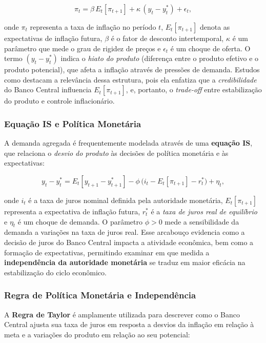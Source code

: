 \documentclass[a4paper,12pt]{article}[abnt2]
\begin{document}
\begin{equation}
\pi_t = \beta \, E_t[\pi_{t+1}] + \kappa \, (y_t - y_t^*) + \epsilon_t,
\end{equation}

onde $\pi_t$ representa a taxa de inflação no período $t$, $E_t[\pi_{t+1}]$ denota as expectativas de inflação futura, $\beta$ é o fator de desconto intertemporal, $\kappa$ é um parâmetro que mede o grau de rigidez de preços e $\epsilon_t$ é um choque de oferta. O termo $(y_t - y_t^*)$ indica o \emph{hiato do produto} (diferença entre o produto efetivo e o produto potencial), que afeta a inflação através de pressões de demanda. Estudos como \cite{unsal2023} destacam a relevância dessa estrutura, pois ela enfatiza que a \emph{credibilidade} do Banco Central influencia $E_t[\pi_{t+1}]$, e, portanto, o \emph{trade-off} entre estabilização do produto e controle inflacionário.

\subsubsection{\textbf{Equação IS e Política Monetária}}
A demanda agregada é frequentemente modelada através de uma \textbf{equação IS}, que relaciona o \emph{desvio do produto} às decisões de política monetária e às expectativas:

\begin{equation}
y_t - y_t^* = E_t[y_{t+1} - y_{t+1}^*] - \phi \, \big( i_t - E_t[\pi_{t+1}] - r_t^* \big) + \eta_t,
\end{equation}

onde $i_t$ é a taxa de juros nominal definida pela autoridade monetária, $E_t[\pi_{t+1}]$ representa a expectativa de inflação futura, $r_t^*$ é a \emph{taxa de juros real de equilíbrio} e $\eta_t$ é um choque de demanda. O parâmetro $\phi > 0$ mede a sensibilidade da demanda a variações na taxa de juros real. Esse arcabouço evidencia como a decisão de juros do Banco Central impacta a atividade econômica, bem como a formação de expectativas, permitindo examinar em que medida a \textbf{independência da autoridade monetária} se traduz em maior eficácia na estabilização do ciclo econômico.

\subsubsection{\textbf{Regra de Política Monetária e Independência}}
A \textbf{Regra de Taylor} é amplamente utilizada para descrever como o Banco Central ajusta sua taxa de juros em resposta a desvios da inflação em relação à meta e a variações do produto em relação ao seu potencial:
\end{document}
